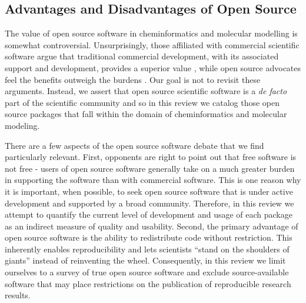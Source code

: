 \subsection*{Advantages and Disadvantages of Open Source}

The value of open source software in cheminformatics and molecular modelling is somewhat controversial.  Unsurprisingly, those affiliated with commercial scientific software argue that traditional commercial development, with its associated support and development, provides a superior value \cite{Krylov_2015}, while open source advocates feel the benefits outweigh the burdens \cite{Gezelter_2015,Jacob_2016}. Our goal is not to revisit these arguments.  Instead, we assert that open source scientific software is a \textit{de facto} part of the scientific community and so in this review we catalog those open source packages that fall within the domain of cheminformatics and molecular modeling.

There are a few aspects of the open source software debate that we find particularly relevant.  First, opponents are right to point out that free software is not free - users of open source software generally take on a much greater burden in supporting the software than with commercial software.  This is one reason why it is important, when possible, to seek open source software that is under active development and supported by a broad community.  Therefore, in this review we attempt to quantify the current level of development and usage of each package as an indirect measure of quality and usability.  Second, the primary advantage of open source software is the ability to redistribute code without restriction.  This inherently enables reproducibility and lets scientists ``stand on the shoulders of giants'' instead of reinventing the wheel. Consequently, in this review we limit ourselves to a survey of true open source software and exclude source-available software that may place restrictions on the publication of reproducible research results. 


